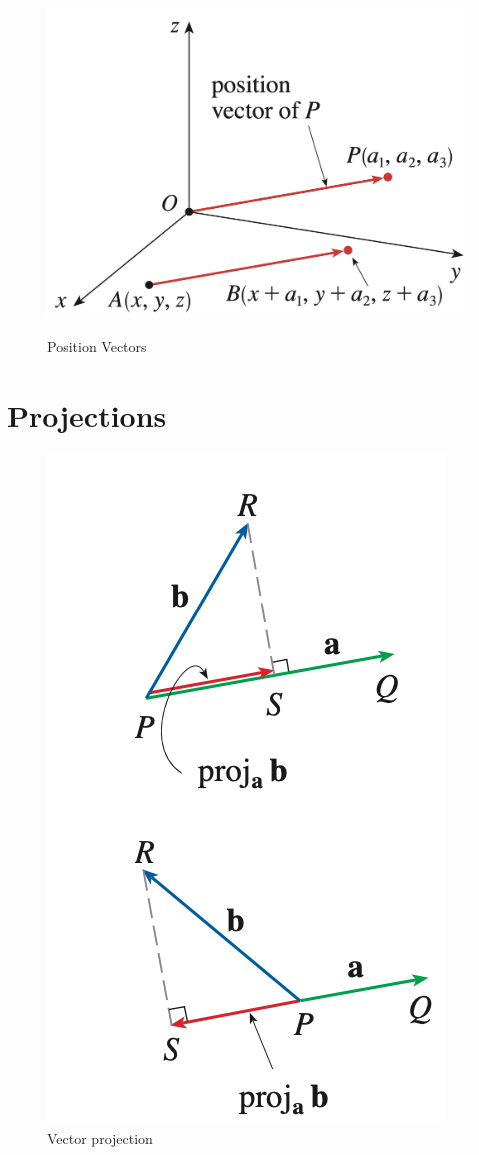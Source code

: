 \begin{figure}[h]
    \centering
    \cite{calculus}
    \includegraphics[scale=0.45]{appendices/figures/figure002}
    \caption{Position Vectors}
    \label{Position Vectors}
\end{figure}

\section{Projections}

\begin{figure}[h]
    \centering
    \includegraphics[scale=0.45]{appendices/figures/fig006}
    \caption{Vector projection}
    \label{Vector projection}
\end{figure}

